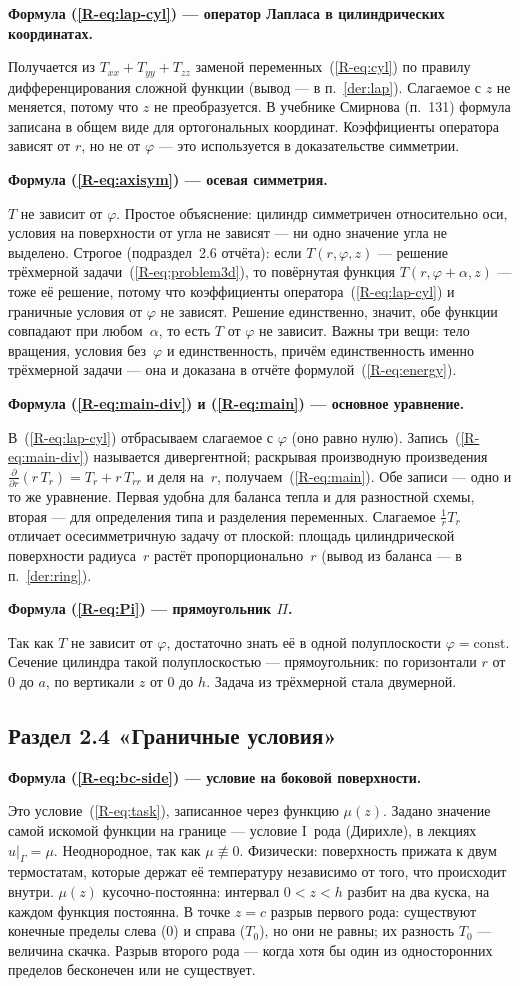 \documentclass[a4paper,12pt]{article}
\newcommand{\rf}[1]{(\ref*{R-#1})}
\newcommand{\fhead}[2]{\par\medskip\textbf{Формула #1 — #2.}\par\nopagebreak[4]}
\begin{document}
\fhead{\rf{eq:lap-cyl}}{оператор Лапласа в цилиндрических координатах}
Получается из $T_{xx}+T_{yy}+T_{zz}$ заменой переменных~\rf{eq:cyl} по
правилу дифференцирования сложной функции (вывод — в п.~\ref{der:lap}).
Слагаемое с $z$ не меняется, потому что $z$ не преобразуется. В учебнике
Смирнова (п.~131) формула записана в общем виде для ортогональных
координат. Коэффициенты оператора зависят от $r$, но не от $\varphi$ — это
используется в доказательстве симметрии.

\fhead{\rf{eq:axisym}}{осевая симметрия}
$T$ не зависит от $\varphi$. Простое объяснение: цилиндр симметричен
относительно оси, условия на поверхности от угла не зависят — ни одно
значение угла не выделено. Строгое (подраздел~2.6 отчёта): если
$T(r,\varphi,z)$ — решение трёхмерной задачи~\rf{eq:problem3d}, то
повёрнутая функция $T(r,\varphi+\alpha,z)$ — тоже её решение, потому что
коэффициенты оператора~\rf{eq:lap-cyl} и граничные условия от $\varphi$ не
зависят. Решение единственно, значит, обе функции совпадают при
любом~$\alpha$, то есть $T$ от $\varphi$ не зависит. Важны три вещи: тело
вращения, условия без~$\varphi$ и единственность, причём единственность
именно трёхмерной задачи — она и доказана в отчёте формулой~\rf{eq:energy}.

\fhead{\rf{eq:main-div} и \rf{eq:main}}{основное уравнение}
В~\rf{eq:lap-cyl} отбрасываем слагаемое с $\varphi$ (оно равно нулю).
Запись~\rf{eq:main-div} называется дивергентной; раскрывая производную
произведения $\frac{\partial}{\partial r}(r\,T_r)=T_r+r\,T_{rr}$ и деля
на~$r$, получаем~\rf{eq:main}. Обе записи — одно и то же уравнение. Первая
удобна для баланса тепла и для разностной схемы, вторая — для определения
типа и разделения переменных. Слагаемое $\frac1r T_r$ отличает
осесимметричную задачу от плоской: площадь цилиндрической поверхности
радиуса~$r$ растёт пропорционально~$r$ (вывод из баланса —
в п.~\ref{der:ring}).

\fhead{\rf{eq:Pi}}{прямоугольник $\Pi$}
Так как $T$ не зависит от $\varphi$, достаточно знать её в одной
полуплоскости $\varphi=\mathrm{const}$. Сечение цилиндра такой
полуплоскостью — прямоугольник: по горизонтали $r$ от 0 до $a$, по
вертикали $z$ от 0 до $h$. Задача из трёхмерной стала двумерной.

\subsection{Раздел 2.4 «Граничные условия»}

\fhead{\rf{eq:bc-side}}{условие на боковой поверхности}
Это условие~\rf{eq:task}, записанное через функцию $\mu(z)$. Задано
значение самой искомой функции на границе — условие I~рода (Дирихле),
в лекциях $u|_\Gamma=\mu$. Неоднородное, так как $\mu\not\equiv0$.
Физически: поверхность прижата к двум термостатам, которые держат её
температуру независимо от того, что происходит внутри. $\mu(z)$
кусочно-постоянна: интервал $0<z<h$ разбит на два куска, на каждом функция
постоянна. В точке $z=c$ разрыв первого рода: существуют конечные пределы
слева (0) и справа ($T_0$), но они не равны; их разность $T_0$ — величина
скачка. Разрыв второго рода — когда хотя бы один из односторонних пределов
бесконечен или не существует.
\end{document}
